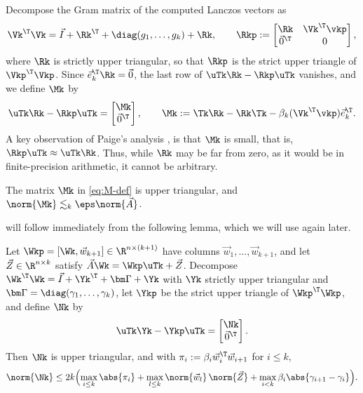 Decompose the Gram matrix of the computed Lanczos vectors as
\begin{equation}
 \Vk^\T\Vk=\vec I+\Rk^\T+\diag(g_1,\ldots,g_k)+\Rk,
 \qquad
 \Rkp:=
 \begin{bmatrix}
  \Rk&\Vk^\T\vkp\\
  \vec 0^\T&0
 \end{bmatrix},
 \label{eq:gram-split}
\end{equation}
where \(\Rk\) is strictly upper triangular, so that \(\Rkp\) is the strict upper triangle of \(\Vkp^\T\Vkp\).
Since \(\vec e_k^\T\Rk=\vec0\), the last row of \(\uTk\Rk-\Rkp\uTk\) vanishes, and we define \(\Mk\) by
\begin{equation}
 \uTk\Rk-\Rkp\uTk
 =\begin{bmatrix}\Mk\\\vec 0^\T\end{bmatrix},
 \qquad
 \Mk:=\Tk\Rk-\Rk\Tk-\beta_k(\Vk^\T\vkp)\vec e_k^\T.
 \label{eq:M-def}
\end{equation}
A key observation of Paige's analysis \cite[eq.~(22)]{paige1976}, \cite[eqs.~(2.17),(2.18)]{paige1980} is that \(\Mk\) is small, that is, \(\Rkp\uTk\approx\uTk\Rk\).
Thus, while \(\Rk\) may be far from zero, as it would be in finite-precision arithmetic, it cannot be arbitrary.

\begin{corollary}
\label{cor:gram-commutator}
The matrix \(\Mk\) in \cref{eq:M-def} is upper triangular, and \(\norm{\Mk}\lesssim_k\eps\norm{\vec A}\).
\end{corollary}

 will follow immediately from the following lemma, which we will use again later.

\begin{lemma}
\label{lem:gram-commutator}
Let \(\Wkp=[\Wk,\vec w_{k+1}]\in\R^{n\times(k+1)}\) have columns \(\vec w_1,\ldots,\vec w_{k+1}\), and let \(\vec Z\in\R^{n\times k}\) satisfy \(\vec A\Wk=\Wkp\uTk+\vec Z\).
Decompose \(\Wk^\T\Wk=\vec I+\Yk^\T+\bm\Gamma+\Yk\) with \(\Yk\) strictly upper triangular and \(\bm\Gamma=\diag(\gamma_1,\ldots,\gamma_k)\), let \(\Ykp\) be the strict upper triangle of \(\Wkp^\T\Wkp\), and define \(\Nk\) by
\[
 \uTk\Yk-\Ykp\uTk
 =\begin{bmatrix}\Nk\\\vec 0^\T\end{bmatrix}.
\]
Then \(\Nk\) is upper triangular, and with \(\pi_i:=\beta_i\vec w_i^\T\vec w_{i+1}\) for \(i\le k\),
\[
 \norm{\Nk}
 \le2k\Bigl(\max_{i\le k}\abs{\pi_i}
 +\max_{l\le k}\norm{\vec w_l}\,\norm{\vec Z}
 +\max_{i<k}\beta_i\abs{\gamma_{i+1}-\gamma_i}\Bigr).
\]
\end{lemma}

